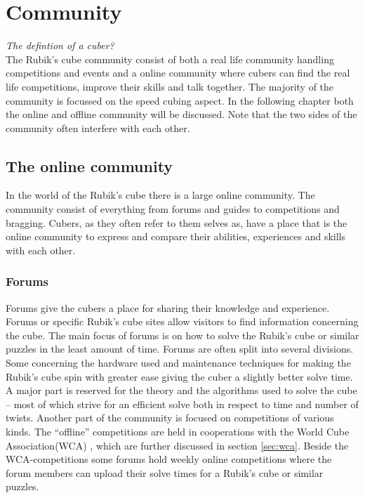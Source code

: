 \chapter{Community}
\textit{The defintion of a cuber?} \\
The Rubik's cube community consist of both a real life community handling competitions and events and a online community where cubers can find the real life competitions, improve their skills and talk together. The majority of the community is focussed on the speed cubing aspect. In the following chapter both the online and offline community will be discussed. Note that the two sides of the community often interfere with each other. 

\section{The online community}
In the world of the Rubik's cube there is a large online community. The community consist of everything from forums and guides to competitions and bragging. Cubers, as they often refer to them selves as, have a place that is the online community to express and compare their abilities, experiences and skills with each other. 

\subsection{Forums}
Forums give the cubers a place for sharing their knowledge and experience\cite{speedsolving.com}\cite{speedcubing.dk}\cite{wca}. Forums or specific Rubik's cube sites allow visitors to find information concerning the cube. The main focus of forums is on how to solve the Rubik's cube or similar puzzles in the least amount of time. Forums are often split into several divisions. Some concerning the hardware used and maintenance techniques for making the Rubik's cube spin with greater ease giving the cuber a slightly better solve time.
A major part is reserved for the theory and the algorithms used to solve the cube -- most of which strive for an efficient solve both in respect to time and number of twists.
Another part of the community is focused on competitions of various kinds. The ``offline'' competitions are held in cooperations with the World Cube Association(WCA) \cite{wca}, which are further discussed in section \ref{sec:wca}. Beside the WCA-competitions some forums hold weekly online competitions where the forum members can upload their solve times for a Rubik's cube or similar puzzles. 

